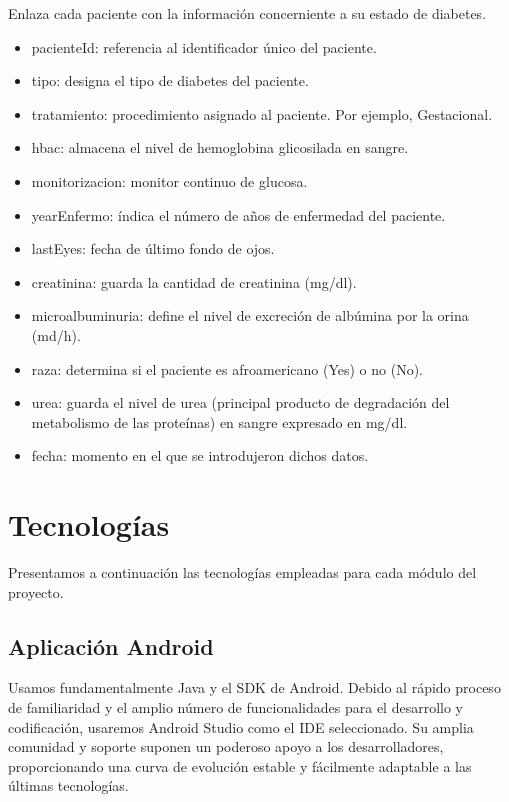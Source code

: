 \documentclass[11pt,spanish,
		listoftables,listoffigures]
		{tfgplantilla}
\begin{document}
Enlaza cada paciente con la información concerniente a su estado de diabetes.
\begin{itemize}
	\item pacienteId: referencia al identificador único del paciente. 
	\item tipo: designa el tipo de diabetes del paciente.
	\item tratamiento: procedimiento asignado al paciente. Por ejemplo, Gestacional.
	\item hbac: almacena el nivel de hemoglobina glicosilada en sangre.
	\item monitorizacion: monitor continuo de glucosa.
	\item yearEnfermo: índica el número de años de enfermedad del paciente.
	\item lastEyes: fecha de último fondo de ojos.
	\item creatinina: guarda la cantidad de creatinina (mg/dl).
	\item microalbuminuria: define el nivel de excreción de albúmina por la orina (md/h).
	\item raza: determina si el paciente es afroamericano (Yes) o no (No).
	\item urea: guarda el nivel de urea (principal producto de degradación del metabolismo de las proteínas) en sangre expresado en mg/dl.
	\item fecha: momento en el que se introdujeron dichos datos.	
\end{itemize}


\chapter{Tecnolog\'ias}

Presentamos a continuación las tecnologías empleadas para cada módulo del proyecto. 

\section {Aplicación Android}

Usamos fundamentalmente Java y el SDK de Android. Debido al rápido proceso de familiaridad y el amplio número de funcionalidades para el desarrollo y codificación, usaremos Android Studio como el IDE seleccionado. Su amplia comunidad y soporte suponen un poderoso apoyo a los desarrolladores, proporcionando una curva de evolución estable y fácilmente adaptable a las últimas tecnologías.
\end{document}
